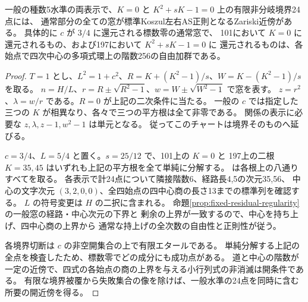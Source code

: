 \begin{theorem}\label{thm:rank-fifteen-pencil-unramified}
一般の種数5水準の両表示で、$K=0$ と $K^2+sK-1=0$ 上の有限非分岐境界24点には、
通常部分の全ての窓が標準Koszul左右AS正則となるZariski近傍がある。
具体的に $c$ が $3/4$ に還元される標数零の通常窓で、
101において $K=0$ に還元されるもの、および197において $K^2+sK-1=0$ に
還元されるものは、各始点で四次中心の多項式環上の階数256の自由加群である。
\end{theorem}
\begin{proof}
$T=1$ とし、$L^2=1+c^2$、$R=K+(K^2-1)/s$、$W=K-(K^2-1)/s$ を取る。
$n=H/L$、$r=R\pm\sqrt{R^2-1}$、$w=W\pm\sqrt{W^2-1}$ で窓を表す。
$z=r^2$、$\lambda=w/r$ である。$R=0$ が上記の二次条件に当たる。
一般の $c$ では指定した三つの $K$ が相異なり、各々で三つの平方根は全て非零である。
関係の表示に必要な $z,\lambda,z-1,w^2-1$ は単元となる。
従ってこのチャートは境界そのものへ延びる。

$c=3/4$、$L=5/4$ と置く。$s=25/12$ で、101上の $K=0$ と
197上の二根 $K=35,45$ はいずれも上記の平方根を全て単純に分解する。
 は各根上の八通りすべてを取る。
各表示で計24点について隣接階数6、経路長4,5の次元35,56、
中心の文字次元 $(3,2,0,0)$、全四始点の四中心商の長さ13までの標準列を確認する。
$L$ の符号変更は $H$ の二択に含まれる。
命題\ref{prop:fixed-residual-regularity}の一般窓の経路・中心次元の下界と
剰余の上界が一致するので、中心を持ち上げ、四中心商の上界から
通常な持上げの全次数の自由性と正則性が従う。

各境界切断は $c$ の非空開集合の上で有限エタールである。
単純分解する上記の全点を検査したため、標数零でどの成分にも成功点がある。
道と中心の階数が一定の近傍で、四式の各始点の商の上界を与える小行列式の非消滅は開条件である。
有限な境界被覆から失敗集合の像を除けば、一般水準の24点を同時に含む所要の開近傍を得る。
\end{proof}
